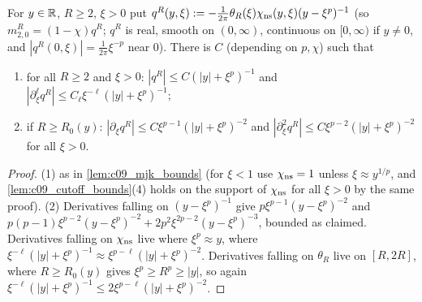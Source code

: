 \begin{lemma}
  \label{lem:c09_q_bounds}
  For $y\in\mathbb{R}$, $R\ge2$, $\xi>0$ put $q^R(y,\xi):=-\frac1{2\pi}\theta_R(\xi)\chi_{\textup{ns}}(y,\xi)(y-\xi^p)^{-1}$ (so $m_{2,0}^R=(1-\chi)q^R$; $q^R$ is real,
  smooth on $(0,\infty)$, continuous on $[0,\infty)$ if $y\neq0$, and $|q^R(0,\xi)|=\frac1{2\pi}\xi^{-p}$ near $0$). There is $C$ (depending on $p,\chi$) such that
  \begin{enumerate}
    \item for all $R\ge2$ and $\xi>0$: $|q^R|\le C(|y|+\xi^p)^{-1}$ and $|\partial_\xi^\ell q^R|\le C_\ell\xi^{-\ell}(|y|+\xi^p)^{-1}$;
    \item if $R\ge R_0(y)$: $|\partial_\xi q^R|\le C\xi^{p-1}(|y|+\xi^p)^{-2}$ and $|\partial_\xi^2q^R|\le C\xi^{p-2}(|y|+\xi^p)^{-2}$ for all $\xi>0$.
  \end{enumerate}
\end{lemma}
\begin{proof}
  (1) as in \cref{lem:c09_mjk_bounds} (for $\xi<1$ use $\chi_{\textup{ns}}=1$ unless $\xi\approx y^{1/p}$, and \cref{lem:c09_cutoff_bounds}(4) holds on the support
  of $\chi_{\textup{ns}}$ for all $\xi>0$ by the same proof). (2) Derivatives falling on $(y-\xi^p)^{-1}$ give $p\xi^{p-1}(y-\xi^p)^{-2}$ and
  $p(p-1)\xi^{p-2}(y-\xi^p)^{-2}+2p^2\xi^{2p-2}(y-\xi^p)^{-3}$, bounded as claimed. Derivatives falling on $\chi_{\textup{ns}}$ live where $\xi^p\approx y$, where
  $\xi^{-\ell}(|y|+\xi^p)^{-1}\approx\xi^{p-\ell}(|y|+\xi^p)^{-2}$. Derivatives falling on $\theta_R$ live on $[R,2R]$, where $R\ge R_0(y)$ gives $\xi^p\ge R^p\ge|y|$, so again
  $\xi^{-\ell}(|y|+\xi^p)^{-1}\le2\xi^{p-\ell}(|y|+\xi^p)^{-2}$.
\end{proof}

